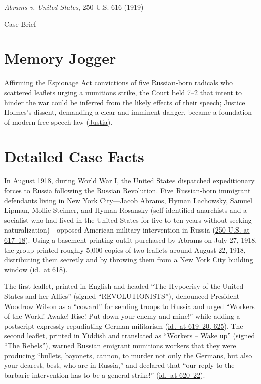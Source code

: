 \documentclass[12pt]{article}
\begin{document}
\begin{center}
{\LARGE \textit{Abrams v. United States}, 250 U.S. 616 (1919)\par}
\vspace{0.8em}
{\large Case Brief\par}
\end{center}
\vspace{1em}

\section{Memory Jogger}
Affirming the Espionage Act convictions of five Russian-born radicals who scattered leaflets urging a munitions strike, the Court held 7--2 that intent to hinder the war could be inferred from the likely effects of their speech; Justice Holmes's dissent, demanding a clear and imminent danger, became a foundation of modern free-speech law (\href{https://supreme.justia.com/cases/federal/us/250/616/}{Justia}).

\section{Detailed Case Facts}
In August 1918, during World War I, the United States dispatched expeditionary forces to Russia following the Russian Revolution. Five Russian-born immigrant defendants living in New York City---Jacob Abrams, Hyman Lachowsky, Samuel Lipman, Mollie Steimer, and Hyman Rosansky (self-identified anarchists and a socialist who had lived in the United States for five to ten years without seeking naturalization)---opposed American military intervention in Russia (\href{https://supreme.justia.com/cases/federal/us/250/616/}{250 U.S. at 617--18}). Using a basement printing outfit purchased by Abrams on July 27, 1918, the group printed roughly 5,000 copies of two leaflets around August 22, 1918, distributing them secretly and by throwing them from a New York City building window (\href{https://supreme.justia.com/cases/federal/us/250/616/}{id.\ at 618}).

The first leaflet, printed in English and headed ``The Hypocrisy of the United States and her Allies'' (signed ``REVOLUTIONISTS''), denounced President Woodrow Wilson as a ``coward'' for sending troops to Russia and urged ``Workers of the World! Awake! Rise! Put down your enemy and mine!'' while adding a postscript expressly repudiating German militarism (\href{https://supreme.justia.com/cases/federal/us/250/616/}{id.\ at 619--20, 625}). The second leaflet, printed in Yiddish and translated as ``Workers -- Wake up'' (signed ``The Rebels''), warned Russian emigrant munitions workers that they were producing ``bullets, bayonets, cannon, to murder not only the Germans, but also your dearest, best, who are in Russia,'' and declared that ``our reply to the barbaric intervention has to be a general strike!'' (\href{https://supreme.justia.com/cases/federal/us/250/616/}{id.\ at 620--22}).
\end{document}
